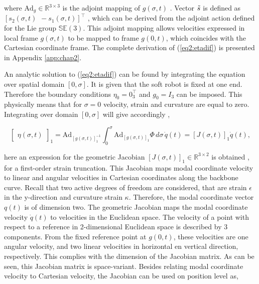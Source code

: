 where $\text{Ad}_g \in \mathbb{R}^{3 \times 3}$ \cite{2DLie} is the adjoint mapping of $g(\sigma,t)$ \cite{Sola2018}. Vector $\Tilde{s}$ is defined as $[s_2(\sigma,t) \hspace{5pt} -s_1(\sigma,t)]^\top$ \cite{2DLie}, which can be derived from the adjoint action defined for the Lie group $\mathbb{SE}(3)$. This adjoint mapping allows velocities expressed in local frame $g(\sigma,t)$ to be mapped to frame $g(0,t)$, which coincides with the Cartesian coordinate frame. The complete derivation of (\ref{eq2:etadif}) is presented in Appendix \ref{app:chap2}. 

An analytic solution to (\ref{eq2:etadif}) can be found by integrating the equation over spatial domain $[0,\sigma]$. It is given that the soft robot is fixed at one end. Therefore the boundary conditions $\eta_0 = 0_{3}^\top$ and $g_0 = I_{3}$ can be imposed. This physically means that for $\sigma = 0$ velocity, strain and curvature are equal to zero. Integrating over domain $[0,\sigma]$ will give accordingly  \cite{Caasenbrood2020},

\begin{equation}
  \begin{bmatrix} \eta(\sigma,t)\end{bmatrix}_1 = \text{Ad}_{[g(\sigma,t)]_1^{-1}} \int_0^{\sigma} \text{Ad}_{[g(\sigma,t)]_1} \Phi \hspace{2pt} d \sigma  \hspace{2pt} \dot{q}(t) = [J(\sigma,t)]_1\dot{q}(t),
    \label{eq2:J}
\end{equation}

here an expression for the geometric Jacobian $[J(\sigma,t)]_1 \in \mathbb{R}^{3\times 2}$ is obtained \cite{Caasenbrood2020}, for a first-order strain truncation. This Jacobian maps modal coordinate velocity to linear and angular velocities in Cartesian coordinates along the backbone curve. Recall that two active degrees of freedom are considered, that are strain $\epsilon$ in the y-direction and curvature strain $\kappa$. Therefore, the modal coordinate vector $q(t)$ is of dimension two. The geometric Jacobian maps the modal coordinate velocity $\dot{q}(t)$ to velocities in the Euclidean space. The velocity of a point with respect to a reference in 2-dimensional Euclidean space is described by 3 components. From the fixed reference point at $g(0,t)$, these velocities are one angular velocity, and two linear velocities in horizontal en vertical direction, respectively. This complies with the dimension of the Jacobian matrix. As can be seen, this Jacobian matrix is space-variant. Besides relating modal coordinate velocity to Cartesian velocity, the Jacobian can be used on position level as,

